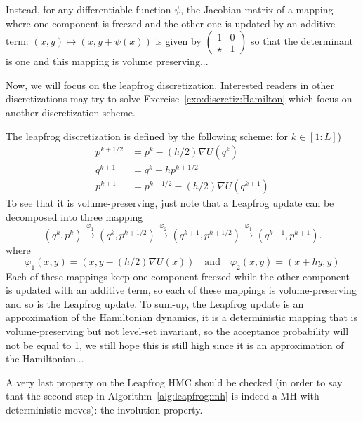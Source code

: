 \documentclass[english,graybox,envcountchap,envcountsame,sectrefs,shortlabels]{svmono}
\theoremstyle{style}
\begin{document}
Instead, for any differentiable function $\psi$, the Jacobian matrix of a mapping where one component is freezed and the other one is updated by an additive term: $(x,y) \mapsto (x,y+\psi(x))$ is given by $\begin{pmatrix}
1 &0\\
\star & 1
\end{pmatrix}$  so that the determinant is one and this mapping is volume preserving...

Now, we will focus on the leapfrog discretization. Interested readers in other discretizations may try to solve Exercise~\ref{exo:discretiz:Hamilton}  which focus on another discretization scheme.



The leapfrog discretization is defined by the following scheme: for $k \in[1:L]$)
\begin{align}
p^{k+1/2}&=p^k-(h/2) \nabla U(q^k) \nonumber\\
q^{k+1}&=q^k+h p^{k+1/2}\nonumber \\
p^{k+1}&=p^{k+1/2}-(h/2) \nabla U (q^{k+1}) \label{eq:leap:update}
\end{align}
To see that it is volume-preserving, just note that a Leapfrog update can be decomposed into three mapping
\begin{equation}
\label{eq:leap:decomp}
(q^k,p^k) \stackrel{\varphi_1}{\longrightarrow} (q^k,p^{k+1/2}) \stackrel{\varphi_2}{\longrightarrow} (q^{k+1},p^{k+1/2}) \stackrel{\varphi_1}{\longrightarrow} (q^{k+1},p^{k+1}).
\end{equation}
where
\begin{equation}\label{eq:def:varphi}
\varphi_1(x,y)=(x,y-(h/2)\nabla U(x))\quad \mbox{and}\quad  \varphi_2(x,y)=(x+hy,y)
\end{equation}
Each of these mappings keep one component freezed while the other component is updated with an additive term, so each of these mappings is volume-preserving and so is the Leapfrog update. To sum-up, the Leapfrog update is an approximation of the Hamiltonian dynamics, it is a deterministic mapping that is volume-preserving but not level-set invariant, so the acceptance probability will not be equal to 1, we still hope this is still high since it is an approximation of the Hamiltonian...

A very last property on the Leapfrog HMC should be checked (in order to say that the second step in Algorithm~\ref{alg:leapfrog:mh} is indeed a MH with deterministic moves): the involution property.
\end{document}
